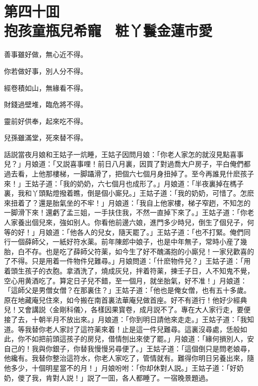 
\chapter*{第四十囬　\\抱孩童瓶兒希寵　粧丫鬟金蓮市愛}


\begin{myquote}
善事雖好做，無心近不得。

你若做好事，別人分不得。

經卷積如山，無緣看不得。

財錢過壁堆，臨危將不得。

靈前好供奉，起來吃不得。

兒孫雖滿堂，死來替不得。
\end{myquote}

話説當夜月娘和王姑子一炕睡，王姑子因問月娘：「你老人家怎的就沒見點喜事兒？」月娘道：「又説喜事哩！前日八月裏，因買了對過喬大户房子，平白俺們都過去看，上他那樓梯，一脚躡滑了，把個六七個月身扭掉了。至今再誰見什麽孩子來！」王姑子道：「我的奶奶，六七個月也成形了。」月娘道：「半夜裏掉在榪子裏，我和丫頭點燈撥着瞧，倒是個小廝兒。」王姑子道：「我的奶奶，可惜了。怎麽來扭着了？還是胎氣坐的不牢！」月娘道：「我自上他家樓，梯子窄趔，不知怎的一脚滑下來！還虧了孟三姐，一手扶住我，不然一直掉下來了。」王姑子道：「你老人家養出個兒來，強如别人。你看他前邊六娘，進門多少時兒，倒生了個兒子，何等的好！」月娘道：「他各人的兒女，隨天罷了。」王姑子道：「也不打緊。俺們同行一個薛師父，一紙好符水薬。前年陳郎中娘子，也是中年無子，常時小産了幾胎，白不存。也是吃了薛師父符薬，如今生了好不醜滿抱的小廝兒！一家兒歡喜的了不得。只是用着一件物件兒難尋。」月娘問道：「什麽物件兒？」王姑子道：「用着頭生孩子的衣胞。拿酒洗了，燒成灰兒，拌着符薬，揀壬子日，人不知鬼不覺，空心用黄酒吃了。算定日子兒不錯，至一個月，就坐胎氣，好不准！」月娘道：「這師父是男僧女僧？在那裏住？」王姑子道：「他也是俺女僧，也有五十多歲。原在地藏庵兒住來，如今搬在南首裏法華庵兒做首座。好不有道行！他好少經典兒！又會講説〈金剛科儀〉，各樣因果寳卷，成月説不了。專在大人家行走，要便接了去，十朝半月不放出來。」月娘道：「你到明日請他來走走。」王姑子道：「我知道。等我替你老人家討了這符薬來着！止是這一件兒難尋。這裏沒尋處，恁般如此，你不如把前頭這孩子的房兒，借情刨出來使了罷。」月娘道：「緣何損別人，安自己的！我與你銀子，你替我慢慢另尋便了。」王姑子道：「這個倒只是問老娘尋，他纔有。我替你整治這符水，你老人家吃了，管情就有。難得你明日另養出來，隨他多少，十個明星當不的月！」月娘吩咐：「你却休對人説。」王姑子道：「好奶奶，儍了我，肯對人説！」説了一囬，各人都睡了。一宿晚景題過。

